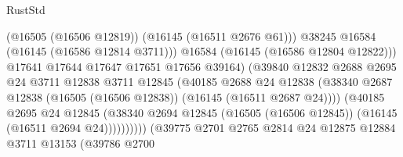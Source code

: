 \begin{lexlean}{RustStd}
\begin{coremodule}
                                                (@16505 (@16506 @12819))
                                                (@16145 (@16511 @2676 @61)))
                                              @38245
                                              @16584
                                              (@16145 (@16586 @12814 @3711)))
                                            @16584
                                            (@16145 (@16586 @12804 @12822)))
                                          @17641
                                          @17644
                                          @17647
                                          @17651
                                          @17656
                                          @39164)
                                        (@39840
                                          @12832
                                          @2688
                                          @2695
                                          @24
                                          @3711
                                          @12838
                                          @3711
                                          @12845
                                          (@40185
                                            @2688
                                            @24
                                            @12838
                                            (@38340
                                              @2687
                                              @12838
                                              (@16505 (@16506 @12838))
                                              (@16145 (@16511 @2687 @24))))
                                          (@40185
                                            @2695
                                            @24
                                            @12845
                                            (@38340
                                              @2694
                                              @12845
                                              (@16505 (@16506 @12845))
                                              (@16145 (@16511 @2694 @24))))))))))
                              (@39775
                                @2701
                                @2765
                                @2814
                                @24
                                @12875
                                @12884
                                @3711
                                @13153
                                (@39786
                                  @2700

\end{coremodule}
\end{lexlean}

